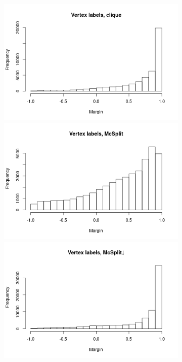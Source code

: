 \documentclass{l4proj}
\theoremstyle{definition}
\theoremstyle{remark}
\begin{document}
\begin{figure}
  \centering
  \begin{subfigure}[t]{0.49\textwidth}
    \centering
    \includegraphics[width=\textwidth]{images/vertex_labels_clique_hist.png}
    \includegraphics[width=\textwidth]{images/vertex_labels_mcsplit_hist.png}
    \includegraphics[width=\textwidth]{images/vertex_labels_mcsplitdown_hist.png}

\end{subfigure}
\end{figure}
\end{document}
